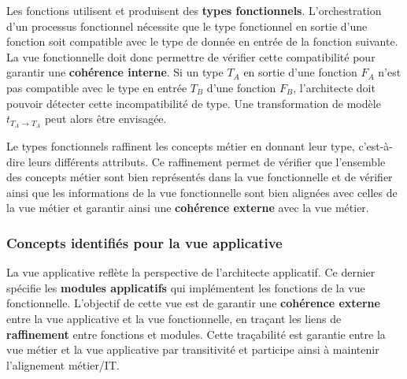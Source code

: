     Les fonctions utilisent et produisent des \textbf{types fonctionnels}. L'orchestration d'un processus fonctionnel
    nécessite que le type fonctionnel en sortie d'une fonction soit compatible avec le type de donnée
    en entrée de la fonction suivante. La vue fonctionnelle doit donc permettre de vérifier cette compatibilité
    pour garantir une \textbf{cohérence interne}.
    Si un type $ T_{A} $ en sortie d'une fonction $ F_{A} $  n'est pas compatible avec le type en entrée
    $ T_{B} $ d'une fonction $ F_{B} $, l'architecte doit pouvoir détecter cette incompatibilité de type.
    Une transformation de modèle $t_{T_{A} \rightarrow T_{A}}$ peut alors être envisagée.

    Le types fonctionnels raffinent les concepts métier en donnant leur type, c'est-à-dire leurs différents attributs.
    Ce raffinement permet de vérifier que l'ensemble des concepts métier sont bien représentés dans la vue
    fonctionnelle et de vérifier ainsi que les informations de la vue fonctionnelle sont bien alignées avec
    celles de la vue métier et garantir ainsi une \textbf{cohérence externe} avec la vue métier.

    \subsubsection{Concepts identifiés pour la vue applicative}
    La vue applicative reflète la perspective de l'architecte applicatif. Ce dernier spécifie les \textbf{modules
    applicatifs} qui implémentent les fonctions de la vue fonctionnelle.
    L'objectif de cette vue est de garantir une \textbf{cohérence externe} entre la vue applicative et la vue fonctionnelle,
    en traçant les liens de \textbf{raffinement} entre fonctions et modules. Cette
    traçabilité est garantie entre la vue métier et la vue applicative par transitivité et participe ainsi
    à maintenir l'alignement métier/IT.

